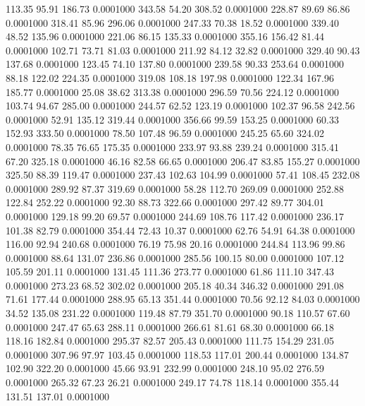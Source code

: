  113.35   95.91  186.73   0.0001000
 343.58   54.20  308.52   0.0001000
 228.87   89.69   86.86   0.0001000
 318.41   85.96  296.06   0.0001000
 247.33   70.38   18.52   0.0001000
 339.40   48.52  135.96   0.0001000
 221.06   86.15  135.33   0.0001000
 355.16  156.42   81.44   0.0001000
 102.71   73.71   81.03   0.0001000
 211.92   84.12   32.82   0.0001000
 329.40   90.43  137.68   0.0001000
 123.45   74.10  137.80   0.0001000
 239.58   90.33  253.64   0.0001000
  88.18  122.02  224.35   0.0001000
 319.08  108.18  197.98   0.0001000
 122.34  167.96  185.77   0.0001000
  25.08   38.62  313.38   0.0001000
 296.59   70.56  224.12   0.0001000
 103.74   94.67  285.00   0.0001000
 244.57   62.52  123.19   0.0001000
 102.37   96.58  242.56   0.0001000
  52.91  135.12  319.44   0.0001000
 356.66   99.59  153.25   0.0001000
  60.33  152.93  333.50   0.0001000
  78.50  107.48   96.59   0.0001000
 245.25   65.60  324.02   0.0001000
  78.35   76.65  175.35   0.0001000
 233.97   93.88  239.24   0.0001000
 315.41   67.20  325.18   0.0001000
  46.16   82.58   66.65   0.0001000
 206.47   83.85  155.27   0.0001000
 325.50   88.39  119.47   0.0001000
 237.43  102.63  104.99   0.0001000
  57.41  108.45  232.08   0.0001000
 289.92   87.37  319.69   0.0001000
  58.28  112.70  269.09   0.0001000
 252.88  122.84  252.22   0.0001000
  92.30   88.73  322.66   0.0001000
 297.42   89.77  304.01   0.0001000
 129.18   99.20   69.57   0.0001000
 244.69  108.76  117.42   0.0001000
 236.17  101.38   82.79   0.0001000
 354.44   72.43   10.37   0.0001000
  62.76   54.91   64.38   0.0001000
 116.00   92.94  240.68   0.0001000
  76.19   75.98   20.16   0.0001000
 244.84  113.96   99.86   0.0001000
  88.64  131.07  236.86   0.0001000
 285.56  100.15   80.00   0.0001000
 107.12  105.59  201.11   0.0001000
 131.45  111.36  273.77   0.0001000
  61.86  111.10  347.43   0.0001000
 273.23   68.52  302.02   0.0001000
 205.18   40.34  346.32   0.0001000
 291.08   71.61  177.44   0.0001000
 288.95   65.13  351.44   0.0001000
  70.56   92.12   84.03   0.0001000
  34.52  135.08  231.22   0.0001000
 119.48   87.79  351.70   0.0001000
  90.18  110.57   67.60   0.0001000
 247.47   65.63  288.11   0.0001000
 266.61   81.61   68.30   0.0001000
  66.18  118.16  182.84   0.0001000
 295.37   82.57  205.43   0.0001000
 111.75  154.29  231.05   0.0001000
 307.96   97.97  103.45   0.0001000
 118.53  117.01  200.44   0.0001000
 134.87  102.90  322.20   0.0001000
  45.66   93.91  232.99   0.0001000
 248.10   95.02  276.59   0.0001000
 265.32   67.23   26.21   0.0001000
 249.17   74.78  118.14   0.0001000
 355.44  131.51  137.01   0.0001000

